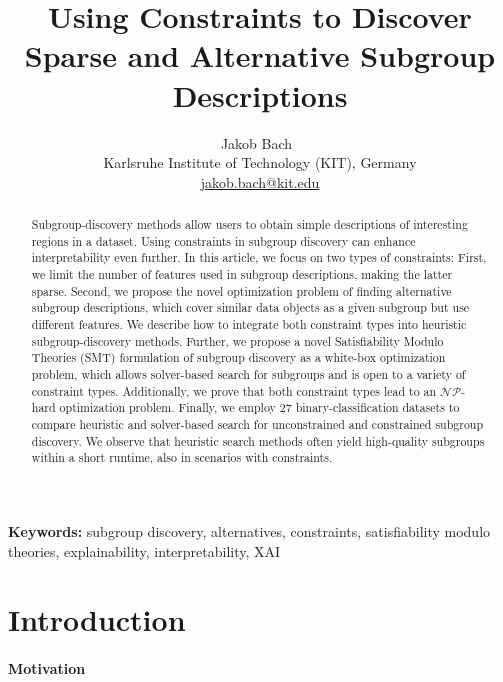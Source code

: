 \documentclass{article}
\title{
	Using Constraints to Discover Sparse and Alternative Subgroup Descriptions
}
\author{
	Jakob Bach~\orcidlink{0000-0003-0301-2798}\\
	\small Karlsruhe Institute of Technology (KIT), Germany\\
	\small \href{mailto:jakob.bach@kit.edu}{jakob.bach@kit.edu}
}
\date{} %
\theoremstyle{definition}
\begin{document}
\maketitle

\begin{abstract}
Subgroup-discovery methods allow users to obtain simple descriptions of interesting regions in a dataset.
Using constraints in subgroup discovery can enhance interpretability even further.
In this article, we focus on two types of constraints:
First, we limit the number of features used in subgroup descriptions, making the latter sparse.
Second, we propose the novel optimization problem of finding alternative subgroup descriptions, which cover similar data objects as a given subgroup but use different features.
We describe how to integrate both constraint types into heuristic subgroup-discovery methods.
Further, we propose a novel Satisfiability Modulo Theories (SMT) formulation of subgroup discovery as a white-box optimization problem, which allows solver-based search for subgroups and is open to a variety of constraint types.
Additionally, we prove that both constraint types lead to an $\mathcal{NP}$-hard optimization problem.
Finally, we employ 27 binary-classification datasets to compare heuristic and solver-based search for unconstrained and constrained subgroup discovery.
We observe that heuristic search methods often yield high-quality subgroups within a short runtime, also in scenarios with constraints.
\end{abstract}
%
\textbf{Keywords:} subgroup discovery, alternatives, constraints, satisfiability modulo theories, explainability, interpretability, XAI

\section{Introduction}
\label{sec:csd:introduction}

\paragraph{Motivation}
\end{document}
